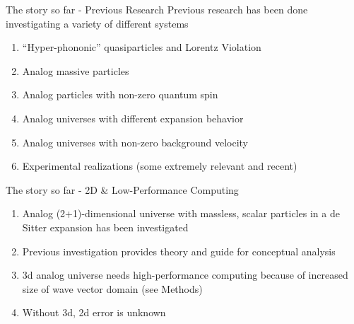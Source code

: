 \documentclass[aspectratio=169]{beamer}
\begin{document}
        \begin{frame}{The story so far - Previous Research}
            Previous research has been done investigating a variety of different systems
            \begin{enumerate}
                \item ``Hyper-phononic'' quasiparticles and Lorentz Violation%
                \item Analog massive particles%
                \item Analog particles with non-zero quantum spin%
                \item Analog universes with different expansion behavior%
                \item Analog universes with non-zero background velocity%
                \item Experimental realizations (some extremely relevant and recent)%
            \end{enumerate}
        \end{frame}

        \begin{frame}{The story so far - 2D \& Low-Performance Computing}
            \begin{enumerate}
                \item Analog (2+1)-dimensional universe with massless, scalar particles in a de Sitter expansion has been investigated
                \item Previous investigation provides theory and guide for conceptual analysis
                \item 3d analog universe needs high-performance computing because of increased size of wave vector domain (see Methods)
                \item Without 3d, 2d error is unknown
            \end{enumerate}
        \end{frame}
        
\end{document}
